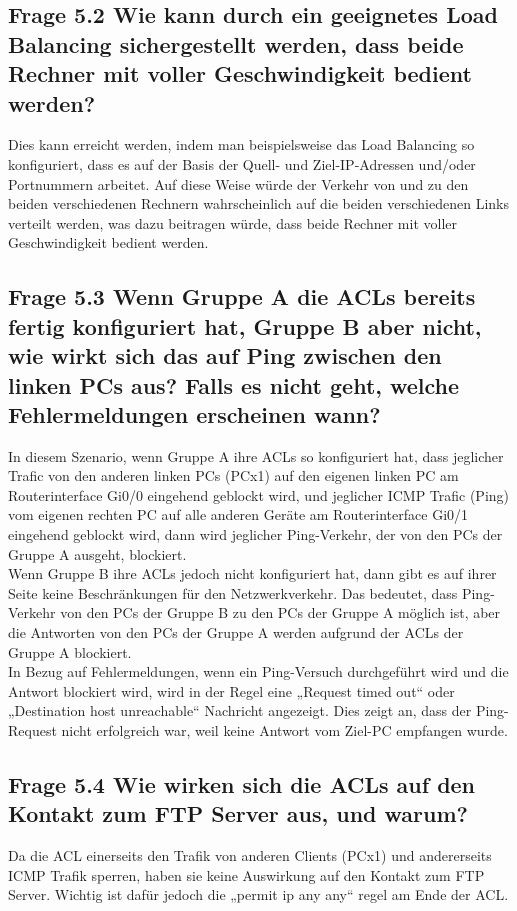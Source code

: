 \documentclass{article}
\begin{document}
\subsection*{Frage 5.2 \normalfont Wie kann durch ein geeignetes Load Balancing sichergestellt werden, dass beide Rechner mit voller Geschwindigkeit bedient werden?}
Dies kann erreicht werden, indem man beispielsweise das Load Balancing so konfiguriert, dass es auf der Basis der Quell- und Ziel-IP-Adressen und/oder Portnummern arbeitet. Auf diese Weise würde der Verkehr von und zu den beiden verschiedenen Rechnern wahrscheinlich auf die beiden verschiedenen Links verteilt werden, was dazu beitragen würde, dass beide Rechner mit voller Geschwindigkeit bedient werden.\\

\subsection*{Frage 5.3 \normalfont Wenn Gruppe A die ACLs bereits fertig konfiguriert hat, Gruppe B aber nicht, wie wirkt sich das auf Ping zwischen den linken PCs aus? Falls es nicht geht, welche Fehlermeldungen erscheinen wann?}
In diesem Szenario, wenn Gruppe A ihre ACLs so konfiguriert hat, dass jeglicher Trafic von den anderen linken PCs (PCx1) auf den eigenen linken PC am Routerinterface Gi0/0 eingehend geblockt wird, und jeglicher ICMP Trafic (Ping) vom eigenen rechten PC auf alle anderen Geräte am Routerinterface Gi0/1 eingehend geblockt wird, dann wird jeglicher Ping-Verkehr, der von den PCs der Gruppe A ausgeht, blockiert.\\

\noindent Wenn Gruppe B ihre ACLs jedoch nicht konfiguriert hat, dann gibt es auf ihrer Seite keine Beschränkungen für den Netzwerkverkehr. Das bedeutet, dass Ping-Verkehr von den PCs der Gruppe B zu den PCs der Gruppe A möglich ist, aber die Antworten von den PCs der Gruppe A werden aufgrund der ACLs der Gruppe A blockiert.\\

\noindent In Bezug auf Fehlermeldungen, wenn ein Ping-Versuch durchgeführt wird und die Antwort blockiert wird, wird in der Regel eine „Request timed out“ oder „Destination host unreachable“ Nachricht angezeigt. Dies zeigt an, dass der Ping-Request nicht erfolgreich war, weil keine Antwort vom Ziel-PC empfangen wurde.\\

\pagebreak

\subsection*{Frage 5.4 \normalfont Wie wirken sich die ACLs auf den Kontakt zum FTP Server aus, und warum?} 
Da die ACL einerseits den Trafik von anderen Clients (PCx1) und andererseits ICMP Trafik sperren, haben sie keine Auswirkung auf den Kontakt zum FTP Server. Wichtig ist dafür jedoch die „permit ip any any“ regel am Ende der ACL.\\
\end{document}
